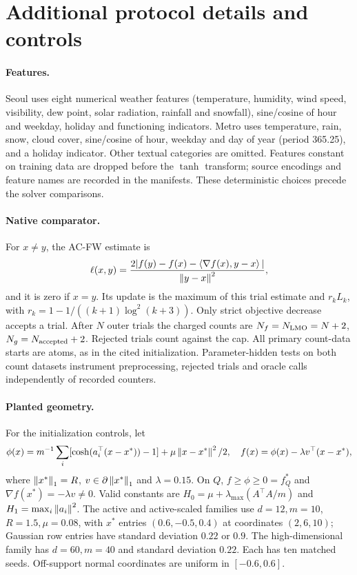 \section{Additional protocol details and controls}
\label{app:protocol}
\paragraph{Features.}
Seoul uses eight numerical weather features (temperature, humidity,
wind speed, visibility, dew point, solar radiation, rainfall and snowfall),
sine/cosine of hour and weekday, holiday and functioning indicators.
Metro uses temperature, rain, snow, cloud cover, sine/cosine of hour,
weekday and day of year (period 365.25), and a holiday indicator.
Other textual categories are omitted. Features constant on training
data are dropped before the $\tanh$ transform; source encodings and
feature names are recorded in the manifests. These deterministic
choices precede the solver comparisons.

\paragraph{Native comparator.}
For $x\ne y$, the AC-FW estimate is
\[
 \ell(x,y)=\frac{2|f(y)-f(x)-\left\langle\nabla f(x),y-x\right\rangle|}{\left\|y-x\right\|^2},
\]
and it is zero if $x=y$. Its update is the maximum of this trial estimate
and $r_kL_k$, with $r_k=1-1/((k+1)\log^2(k+3))$.
Only strict objective decrease accepts a trial.
After $N$ outer trials the charged counts are
$N_f=N_{\rm LMO}=N+2$, $N_g=N_{\rm accepted}+2$.
Rejected trials count against the cap. All primary count-data starts
are atoms, as in the cited initialization. Parameter-hidden tests on
both count datasets instrument preprocessing, rejected trials and
oracle calls independently of recorded counters.

\paragraph{Planted geometry.}
For the initialization controls, let
\[
 \phi(x)=m^{-1}\sum_i[\cosh(a_i^\top(x-x^*))-1]
                         +\mu\left\|x-x^*\right\|^2/2,
 \quad f(x)=\phi(x)-\lambda v^\top(x-x^*),
\]
where $\left\|x^*\right\|_1=R$, $v\in\partial\left\|x^*\right\|_1$ and
$\lambda=0.15$. On $Q$, $f\ge\phi\ge0=f_Q^*$ and
$\nabla f(x^*)=-\lambda v\ne0$. Valid constants are
$H_0=\mu+\lambda_{\max}(A^\top A/m)$ and
$H_1=\max_i\left\|a_i\right\|^2$.
The active and active-scaled families use $d=12,m=10$,
$R=1.5,\mu=0.08$, with $x^*$ entries $(0.6,-0.5,0.4)$ at
coordinates $(2,6,10)$; Gaussian row entries have standard deviation
$0.22$ or $0.9$. The high-dimensional family has $d=60,m=40$
and standard deviation $0.22$. Each has ten matched seeds.
Off-support normal coordinates are uniform in $[-0.6,0.6]$.

